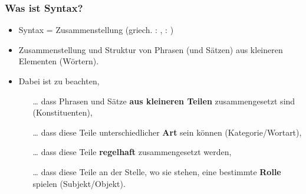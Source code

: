 \begin{frame}
\frametitle{Was ist Syntax?}

\begin{itemize}
	\item Syntax = Zusammenstellung (griech. : , : )
	\item[]
	\item Zusammenstellung und Struktur von Phrasen (und Sätzen) aus kleineren Elementen (Wörtern).
\end{itemize}

\nocite{Roedel16a}

\end{frame}

\begin{frame}

\begin{itemize}

	\item Dabei ist zu beachten,
	
	\begin{itemize}
		\item[\dots] dass Phrasen und Sätze \textbf{aus kleineren Teilen} zusammengesetzt sind (Konstituenten),
		\item[]
		\item [\dots] dass diese Teile unterschiedlicher \textbf{Art} sein können (Kategorie/Wortart),
		\item[]
		\item [\dots] dass diese Teile \textbf{regelhaft} zusammengesetzt werden,
		\item[]
		\item[\dots] dass diese Teile an der Stelle, wo sie stehen, eine bestimmte \textbf{Rolle} spielen (Subjekt/Objekt).
 		
	\end{itemize}
	
\end{itemize}

\end{frame}


